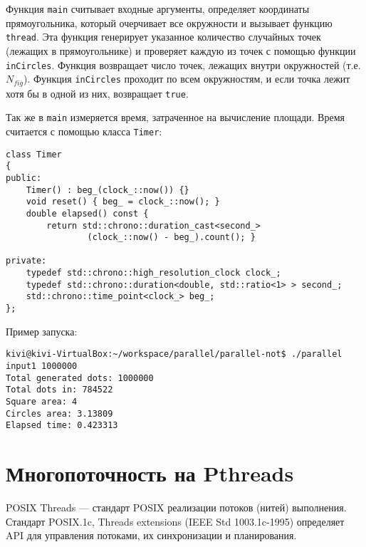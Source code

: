 Функция \texttt{main} считывает входные аргументы, определяет координаты прямоугольника, который очерчивает все окружности и вызывает функцию \texttt{thread}. Эта функция генерирует указанное количество случайных точек (лежащих в прямоугольнике) и проверяет каждую из точек с помощью функции \texttt{inCircles}. Функция возвращает число точек, лежащих внутри окружностей (т.е. $N_{fig}$). Функция \texttt{inCircles} проходит по всем окружностям, и если точка лежит хотя бы в одной из них, возвращает \texttt{true}.

Так же в \texttt{main} измеряется время, затраченное на вычисление площади. Время считается с помощью класса \texttt{Timer}:
\begin{lstlisting}[caption={Класс Timer}, label={lst:timer}, style=crs_cpp]
class Timer
{
public:
    Timer() : beg_(clock_::now()) {}
    void reset() { beg_ = clock_::now(); }
    double elapsed() const {
        return std::chrono::duration_cast<second_>
                (clock_::now() - beg_).count(); }

private:
    typedef std::chrono::high_resolution_clock clock_;
    typedef std::chrono::duration<double, std::ratio<1> > second_;
    std::chrono::time_point<clock_> beg_;
};
\end{lstlisting}

Пример запуска:
\begin{lstlisting}[style=crs_bash]
kivi@kivi-VirtualBox:~/workspace/parallel/parallel-not$ ./parallel input1 1000000
Total generated dots: 1000000
Total dots in: 784522
Square area: 4
Circles area: 3.13809
Elapsed time: 0.423313
\end{lstlisting}

\section{Многопоточность на Pthreads}

POSIX Threads --- стандарт POSIX реализации потоков (нитей) выполнения. Стандарт POSIX.1c, Threads extensions (IEEE Std 1003.1c-1995) определяет API для управления потоками, их синхронизации и планирования.

